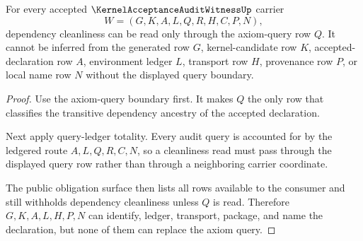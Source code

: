 \begin{theorem}
\label{thm:kernel-acceptance-audit-witness-dependency-query-exhaustion}
For every accepted $\KernelAcceptanceAuditWitnessUp$ carrier
$$
W=(G,K,A,L,Q,R,H,C,P,N),
$$
dependency cleanliness can be read only through the axiom-query row $Q$. It cannot be inferred from the generated row $G$, kernel-candidate row $K$, accepted-declaration row $A$, environment ledger $L$, transport row $H$, provenance row $P$, or local name row $N$ without the displayed query boundary.
\end{theorem}
\begin{proof}
Use the axiom-query boundary first. It makes $Q$ the only row that classifies the transitive dependency ancestry of the accepted declaration.

Next apply query-ledger totality. Every audit query is accounted for by the ledgered route $A,L,Q,R,C,N$, so a cleanliness read must pass through the displayed query row rather than through a neighboring carrier coordinate.

The public obligation surface then lists all rows available to the consumer and still withholds dependency cleanliness unless $Q$ is read. Therefore $G,K,A,L,H,P,N$ can identify, ledger, transport, package, and name the declaration, but none of them can replace the axiom query.
\end{proof}

